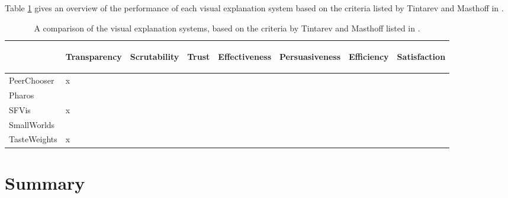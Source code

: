 Table \ref{table:comparison:criteria} gives an overview of the performance of each visual explanation system based on the criteria listed by Tintarev and Masthoff in \cite{tintarev:2007:SER:1547550.1547664}.

\begin{center}
	\begin{table}%
	\caption{A comparison of the visual explanation systems, based on the criteria by Tintarev and Masthoff listed in \cite{tintarev:2007:SER:1547550.1547664}.}
		\begin{center}
			\begin{tabular}{l | l l l l l l l }
				\hline
											&	\begin{sideways}Transparency\end{sideways} & \begin{sideways}Scrutability\end{sideways} & \begin{sideways}Trust\end{sideways} & \begin{sideways}Effectiveness\end{sideways} & \begin{sideways}Persuasiveness\end{sideways} & \begin{sideways}Efficiency\end{sideways} & \begin{sideways}Satisfaction\end{sideways}  \\
				\hline
				PeerChooser		&	x &	&	&	& & &  \\
				Pharos				&	 &	&	&	& & &  \\
				SFVis					&	x &	&	&	& & &  \\
				SmallWorlds		&	 &	&	&	& & &  \\
				TasteWeights	&	x &	&	&	& & &  \\
				\hline
			\end{tabular}
		\end{center}
		
		\label{table:comparison:criteria}
	\end{table}
\end{center}







\section{Summary}\label{chapter:literature_study:section:summary}

